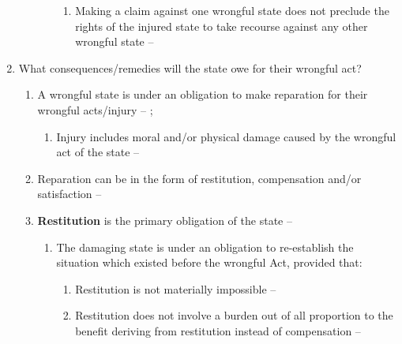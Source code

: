 \begin{enumerate}
\begin{enumerate}
\begin{enumerate}
\begin{enumerate}
                \item Making a claim against one wrongful state does not preclude the rights of the injured state to take recourse against any other wrongful state -- 
            \end{enumerate}
        \end{enumerate}
    \end{enumerate}
    \item What consequences/remedies will the state owe for their wrongful act?
    \begin{enumerate}
        \item A wrongful state is under an obligation to make reparation for their wrongful acts/injury -- ; 
        \begin{enumerate}
            \item Injury includes moral and/or physical damage caused by the wrongful act of the state -- 
        \end{enumerate}
        \item Reparation can be in the form of restitution, compensation and/or satisfaction -- 
        \item \textbf{Restitution} is the primary obligation of the state -- 
        \begin{enumerate}
            \item The damaging state is under an obligation to re-establish the situation which existed before the wrongful Act, provided that:
            \begin{enumerate}
                \item Restitution is not materially impossible -- 
                \item Restitution does not involve a burden out of all proportion to the benefit deriving from restitution instead of compensation -- 

\end{enumerate}
\end{enumerate}
\end{enumerate}
\end{enumerate}

